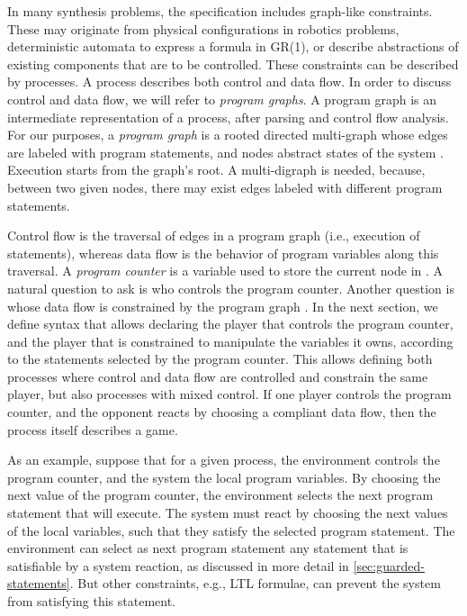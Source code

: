 \documentclass[copyright]{eptcs}
\begin{document}
In many synthesis problems, the specification includes graph-like constraints.
These may originate from physical configurations in robotics problems, deterministic automata to express a formula in GR(1), or describe abstractions of existing components that are to be controlled.
These constraints can be described by processes.
A process describes both control and data flow.
In order to discuss control and data flow, we will refer to {\em program graphs}.
A program graph is an intermediate representation of a process, after parsing and control flow analysis.
For our purposes, a {\em program graph} is a rooted directed multi-graph  whose edges  are labeled with program statements, and nodes  abstract states of the system \cite{Keller76cacm,Baier08}.
Execution starts from the graph's root.
A multi-digraph is needed, because, between two given nodes, there may exist edges labeled with different program statements.

Control flow is the traversal of edges in a program graph (i.e., execution of statements), whereas data flow is the behavior of program variables along this traversal.
A {\em program counter}  is a variable used to store the current node in .
A natural question to ask is who controls the program counter.
Another question is whose data flow is constrained by the program graph .
In the next section, we define syntax that allows declaring the player that controls the program counter, and the player that is constrained to manipulate the variables it owns, according to the statements selected by the program counter.
This allows defining both processes where control and data flow are controlled and constrain the same player, but also processes with mixed control.
If one player controls the program counter, and the opponent reacts by choosing a compliant data flow, then the process itself describes a game.

As an example, suppose that for a given process, the environment controls the program counter, and the system the local program variables.
By choosing the next value of the program counter, the environment selects the next program statement that will execute.
The system must react by choosing the next values of the local variables, such that they satisfy the selected program statement.
The environment can select as next program statement any statement that is satisfiable by a system reaction, as discussed in more detail in \cref{sec:guarded-statements}.
But other constraints, e.g., LTL formulae, can prevent the system from satisfying this statement.
\end{document}
